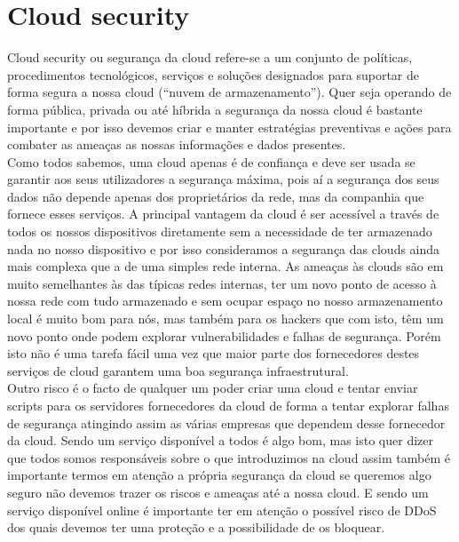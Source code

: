 \documentclass{report}
\begin{document}
\section{Cloud security}
\cite{cybersecurityguide}
\normalsize{Cloud security ou segurança da cloud refere-se a um conjunto de políticas, procedimentos tecnológicos, serviços e soluções designados para suportar de forma segura a nossa cloud (“nuvem de armazenamento”).
Quer seja operando de forma pública, privada ou até híbrida a segurança da nossa cloud é bastante importante e por isso devemos criar e manter estratégias preventivas e ações para combater as ameaças as nossas informações e dados presentes.\\
Como todos sabemos, uma cloud apenas é de confiança e deve ser usada se garantir aos seus utilizadores a segurança máxima, pois aí a segurança dos seus dados não depende apenas dos proprietários da rede, mas da companhia que fornece esses serviços. A principal vantagem da cloud é ser acessível a través de todos os nossos dispositivos diretamente sem a necessidade de ter armazenado nada no nosso dispositivo e por isso consideramos a segurança das clouds ainda mais complexa que a de uma simples rede interna. 
As ameaças às clouds são em muito semelhantes às das típicas redes internas, ter um novo ponto de acesso à nossa rede com tudo armazenado e sem ocupar espaço no nosso armazenamento local é muito bom para nós, mas também para os hackers que com isto, têm um novo ponto onde podem explorar vulnerabilidades e falhas de segurança. Porém isto não é uma tarefa fácil uma vez que maior parte dos fornecedores destes serviços de cloud garantem uma boa segurança infraestrutural.\\
Outro risco é o facto de qualquer um poder criar uma cloud e tentar enviar scripts para os servidores fornecedores da cloud de forma a tentar explorar falhas de segurança atingindo assim as várias empresas que dependem desse fornecedor da cloud.
Sendo um serviço disponível a todos é algo bom, mas isto quer dizer que todos somos responsáveis sobre o que introduzimos na cloud assim também é importante termos em atenção a própria segurança da cloud se queremos algo seguro não devemos trazer os riscos e ameaças até a nossa cloud.
E sendo um serviço disponível online é importante ter em atenção o possível risco de \ac{DDoS} dos quais devemos ter uma proteção e a possibilidade de os bloquear.}
\end{document}
